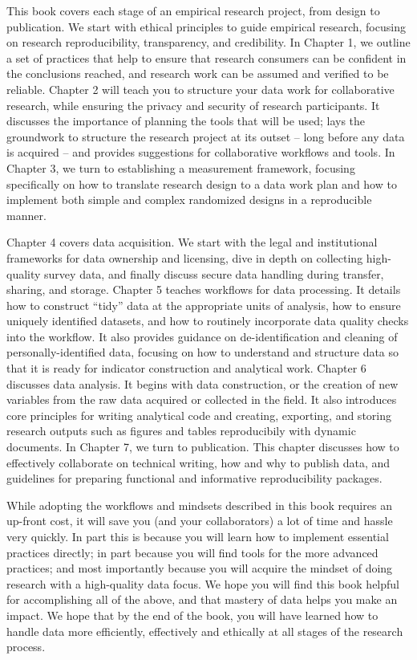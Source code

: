 This book covers each stage of an empirical research project, from design to publication.
We start with ethical principles to guide empirical research,
focusing on research reproducibility, transparency, and credibility.
In Chapter 1, we outline a set of practices that help to ensure that
research consumers can be confident in the conclusions reached,
and research work can be assumed and verified to be reliable.
Chapter 2 will teach you to structure your data work for collaborative research,
while ensuring the privacy and security of research participants.
It discusses the importance of planning the tools that will be used;
lays the groundwork to structure the research project at its outset --
long before any data is acquired --
and provides suggestions for collaborative workflows and tools.
In Chapter 3, we turn to establishing a measurement framework,
focusing specifically on how to translate research design to a data work plan
and how to implement both simple and complex randomized designs in a reproducible manner.

Chapter 4 covers data acquisition. We start with
the legal and institutional frameworks for data ownership and licensing,
dive in depth on collecting high-quality survey data,
and finally discuss secure data handling during transfer, sharing, and storage.
Chapter 5 teaches workflows for data processing.
It details how to construct ``tidy'' data at the appropriate units of analysis,
how to ensure uniquely identified datasets, and
how to routinely incorporate data quality checks into the workflow.
It also provides guidance on de-identification and cleaning of personally-identified data,
focusing on how to understand and structure data
so that it is ready for indicator construction and analytical work.
Chapter 6 discusses data analysis.
It begins with data construction, or the creation of new variables
from the raw data acquired or collected in the field.
It also introduces core principles for writing analytical code
and creating, exporting, and storing research outputs such as figures and tables reproducibily with dynamic documents.
In Chapter 7, we turn to publication.
This chapter discusses
how to effectively collaborate on technical writing,
how and why to publish data,
and guidelines for preparing functional and informative reproducibility packages.

While adopting the workflows and mindsets described in this book requires an up-front cost,
it will save you (and your collaborators) a lot of time and hassle very quickly.
In part this is because you will learn how to implement essential practices directly;
in part because you will find tools for the more advanced practices;
and most importantly because you will acquire the mindset of doing research with a high-quality data focus.
We hope you will find this book helpful for accomplishing all of the above,
and that mastery of data helps you make an impact.
We hope that by the end of the book,
you will have learned how to handle data more efficiently, effectively and ethically
at all stages of the research process.

\mainmatter
